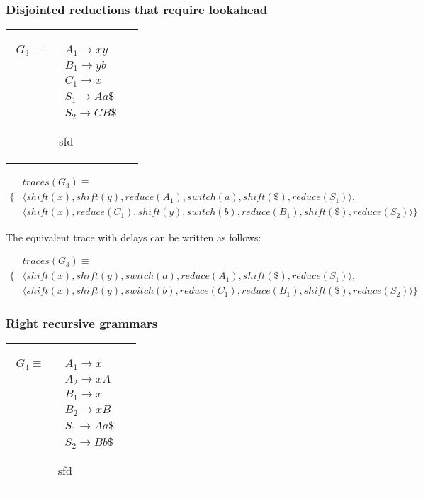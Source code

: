 \documentclass[11pt]{article}
\begin{document}
\subsubsection{Disjointed reductions that require lookahead}
\begin{tabular}[t]{cl}
\parbox{.3\textwidth}{
\begin{align*}
G_3 \equiv \quad & A_1 \rightarrow x y\\
                 & B_1 \rightarrow y b\\
                 & C_1 \rightarrow x\\
                 & S_1 \rightarrow A a \$\\
                 & S_2 \rightarrow C B \$
\end{align*}}
\parbox{.8\textwidth}{sfd}
\end{tabular}

\parbox{.3\textwidth}{\begin{align*}
&traces(G_3) \equiv \\
\{ & \langle shift(x), shift(y), reduce(A_1), switch(a), shift(\$), reduce(S_1) \rangle,\\
   & \langle shift(x), reduce(C_1), shift(y), switch(b), reduce(B_1), shift(\$), reduce(S_2) \rangle \}
\end{align*}}

The equivalent trace with delays can be written as follows:

\parbox{.3\textwidth}{\begin{align*}
&traces(G_3) \equiv \\
\{ & \langle shift(x), shift(y), switch(a), reduce(A_1), shift(\$), reduce(S_1) \rangle,\\
   & \langle shift(x), shift(y), switch(b), reduce(C_1), reduce(B_1), shift(\$), reduce(S_2) \rangle \}
\end{align*}}

\subsubsection{Right recursive grammars}
\begin{tabular}[t]{cl}
\parbox{.3\textwidth}{
\begin{align*}
G_4 \equiv \quad & A_1 \rightarrow x\\
                 & A_2 \rightarrow x A\\
                 & B_1 \rightarrow x\\
                 & B_2 \rightarrow x B\\
                 & S_1 \rightarrow A a \$\\
                 & S_2 \rightarrow B b \$
\end{align*}}
\parbox{.8\textwidth}{sfd}
\end{tabular}
\end{document}
